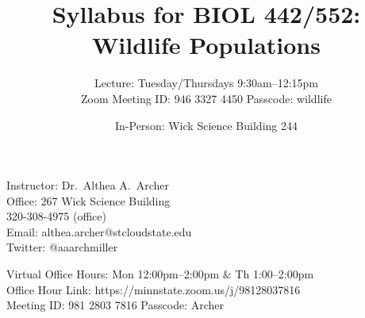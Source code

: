 \documentclass{tufte-handout}
\title{Syllabus for BIOL 442/552: Wildlife Populations}										%
\author{Lecture: Tuesday/Thursdays 9:30am--12:15pm \\
\color{gray} Zoom Meeting ID: 946 3327 4450
Passcode: wildlife \color{black}}								%
\date{In-Person: Wick Science Building 244}
\begin{document}
\maketitle

Instructor: Dr.~Althea A.~Archer\\
Office: 267 Wick Science Building\\
320-308-4975 (office) \\
Email: althea.archer@stcloudstate.edu\\
Twitter: @aaarchmiller

\color{gray} Virtual Office Hours: Mon 12:00pm--2:00pm \& Th 1:00--2:00pm\\
Office Hour Link: https://minnstate.zoom.us/j/98128037816\\
Meeting ID: 981 2803 7816 Passcode: Archer \color{black}
\end{document}
